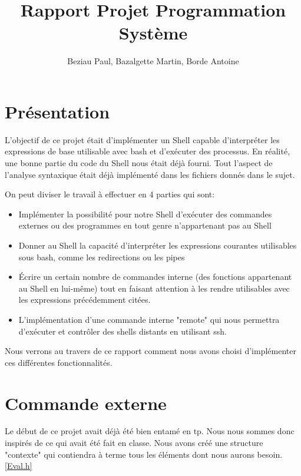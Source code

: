 \documentclass[12pt]{article}
\title{Rapport Projet Programmation Système}
\author{Beziau Paul, Bazalgette Martin, Borde Antoine}
\begin{document}
\maketitle
\tableofcontents

\newpage
\section{Présentation}

L'objectif de ce projet était d'implémenter un Shell capable d'interpréter les expressions de base
utilisable avec bash et d'exécuter des processus. En réalité, une bonne partie du code du Shell
nous était déjà fourni. Tout l'aspect de l'analyse syntaxique était déjà implémenté dans les fichiers
donnés dans le sujet.\newline

On peut diviser le travail à effectuer en 4 parties qui sont:
\begin{itemize}
 \item Implémenter la possibilité pour notre Shell d'exécuter des
 commandes externes ou des programmes en tout genre n'appartenant pas au Shell
 \item Donner au Shell la capacité d'interpréter les expressions courantes
 utilisables sous bash, comme les redirections ou les pipes
 \item Écrire un certain nombre de commandes interne (des fonctions appartenant
 au Shell en lui-même) tout en faisant attention à les rendre utilisables avec
 les expressions précédemment citées.
 \item L'implémentation d'une commande interne "remote" qui nous permettra d'exécuter
 et contrôler des shells distants en utilisant ssh.\newline 
\end{itemize}

Nous verrons au travers de ce rapport comment nous avons choisi d'implémenter ces différentes
fonctionnalités.

\newpage

\section{Commande externe}
 
 Le début de ce projet avait déjà été bien entamé en tp. Nous nous sommes donc
 inspirés de ce qui avait été fait en classe. Nous avons créé une structure "contexte"
 qui contiendra à terme tous les éléments dont nous aurons besoin. \ref{Eval.h}
 
\end{document}
